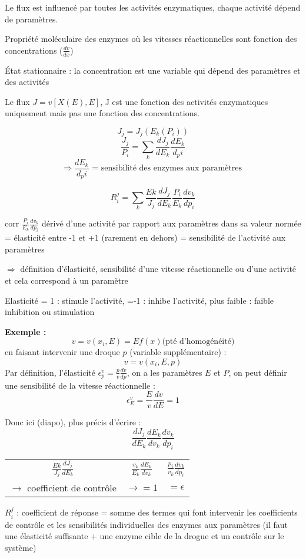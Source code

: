 Le flux est influencé par toutes les activités enzymatiques, chaque activité dépend de paramètres.

Propriété moléculaire des enzymes où les vitesses réactionnelles sont fonction des concentrations ($\frac{dv}{dx}$)

État stationnaire : la concentration est une variable qui dépend des paramètres et des activités

Le flux $J = v[X(E),E]$, J est une fonction des activités enzymatiques uniquement mais pas une fonction des concentrations. 
 	
$$ J_j = J_j(E_k(P_i))$$
$$ \frac{J_j}{P_i}= \sum_k \frac{dJ_j}{dE_k} \frac{dE_k}{d_pi} $$
$$ \Rightarrow \frac{dE_k}{d_pi}\text{ = sensibilité des enzymes aux paramètres }$$


$$ R^j_i = \sum_k \frac{Ek}{J_j}\frac{dJ_j}{dE_k}\frac{P_i}{E_k}\frac{dv_k}{dp_i}  $$

corr $\frac{P_i}{E_k}\frac{dv_k}{dp_i}$ dérivé d'une activité par rapport aux paramètres dans sa valeur normée = élasticité entre -1 et +1 (rarement en dehors) = sensibilité de l'activité aux paramètres 

$\Rightarrow$ définition d'élasticité, sensibilité d'une vitesse réactionnelle ou d'une activité et cela correspond à un paramètre

Elasticité = 1 : stimule l'activité, =-1 : inhibe l'activité, plus faible : faible inhibition ou stimulation


\textbf{Exemple :}
$$ v = v(x_i, E) = E f(x) \text{(pté d'homogénéité)} $$
 en faisant intervenir une droque $p$ (variable supplémentaire) :
	$$ v = v(x_i, E, p) $$
Par définition, l'élasticité $\epsilon_p^v = \frac{p}{v} \frac{dv}{dp}$, on a les paramètres $E$ et $P$, on peut définir une sensibilité de la vitesse réactionnelle :
	$$ \epsilon_E^v = \frac{E}{v}\frac{dv}{dE}=1 $$

Donc ici (diapo), plus précis d'écrire :
	$$ \frac{dJ_j}{dE_k}\frac{dE_k}{dv_k}\frac{dv_k}{dp_i} $$
	
\begin{tabular}{c|c|c}
	$\frac{Ek}{J_j} \frac{dJ_j}{dE_k}$	&	$\frac{v_k}{E_k}\frac{dE_k}{dv_k}$	&	$\frac{p_i}{v_k}\frac{dv_k}{dp_i}$ \\
	$\rightarrow$ coefficient de contrôle	&	$\rightarrow =  1$	&	$ = \epsilon$ \\
\end{tabular} 



$R_i^j$ : coefficient de réponse = somme des termes qui font intervenir les coefficients de contrôle et les sensibilités individuelles des enzymes aux paramètres (il faut une élasticité suffisante $+$ une enzyme cible de la drogue et un contrôle sur le système)

